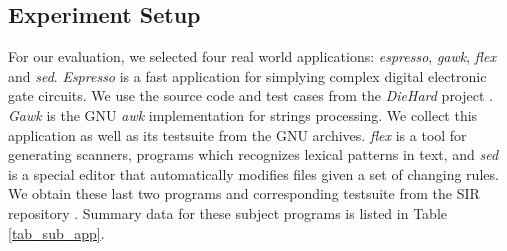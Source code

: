 \subsection{Experiment Setup}


\begin{table}[htbp]
\centering
\caption{Subject applications}
\label{tab_sub_app}
\end{table}

For our evaluation, we selected four real world applications: \emph{espresso}, \emph{gawk}, \emph{flex} and \emph{sed}. \emph{Espresso} is a fast application for simplying complex digital electronic gate circuits. We use the source code and test cases from the \emph{DieHard} project \cite{Berger:2006:DPM:1133981.1134000}. \emph{Gawk} is the GNU \emph{awk} implementation for strings processing. We collect this application as well as its testsuite from the GNU archives. \emph{flex} is a tool for generating scanners, programs which recognizes lexical patterns in text, and \emph{sed} is a special editor that automatically modifies files given a set of changing rules. We obtain these last two programs and corresponding testsuite from the SIR repository \cite{SIR2005}. Summary data for these subject programs is listed in Table \ref{tab_sub_app}.
%


